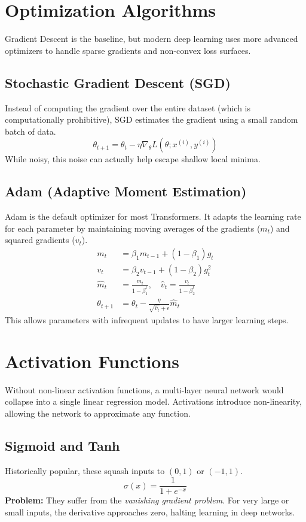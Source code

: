 \section{Optimization Algorithms}

Gradient Descent is the baseline, but modern deep learning uses more advanced optimizers to handle sparse gradients and non-convex loss surfaces.

\subsection{Stochastic Gradient Descent (SGD)}
Instead of computing the gradient over the entire dataset (which is computationally prohibitive), SGD estimates the gradient using a small random batch of data.
\begin{equation}
    \theta_{t+1} = \theta_t - \eta \nabla_{\theta} L(\theta; x^{(i)}, y^{(i)})
\end{equation}
While noisy, this noise can actually help escape shallow local minima.

\subsection{Adam (Adaptive Moment Estimation)}
Adam is the default optimizer for most Transformers. It adapts the learning rate for each parameter by maintaining moving averages of the gradients ($m_t$) and squared gradients ($v_t$).
\begin{align}
    m_t &= \beta_1 m_{t-1} + (1 - \beta_1) g_t \\
    v_t &= \beta_2 v_{t-1} + (1 - \beta_2) g_t^2 \\
    \hat{m}_t &= \frac{m_t}{1 - \beta_1^t}, \quad \hat{v}_t = \frac{v_t}{1 - \beta_2^t} \\
    \theta_{t+1} &= \theta_t - \frac{\eta}{\sqrt{\hat{v}_t} + \epsilon} \hat{m}_t
\end{align}
This allows parameters with infrequent updates to have larger learning steps.

\section{Activation Functions}

Without non-linear activation functions, a multi-layer neural network would collapse into a single linear regression model. Activations introduce non-linearity, allowing the network to approximate any function.

\subsection{Sigmoid and Tanh}
Historically popular, these squash inputs to $(0, 1)$ or $(-1, 1)$.
\begin{equation}
    \sigma(x) = \frac{1}{1 + e^{-x}}
\end{equation}
\textbf{Problem:} They suffer from the \textit{vanishing gradient problem}. For very large or small inputs, the derivative approaches zero, halting learning in deep networks.

